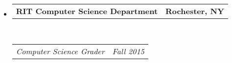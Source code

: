 \documentclass[10pt, letterpaper]{article}
\makeatletter
\newcommand{\headerrow}[2]
{\begin{tabular*}{\linewidth}{l@{\extracolsep{\fill}}r}
	#1 &
	#2 \\
\end{tabular*}}
\makeatother
\begin{document}
\begin{itemize}
	\item
	\headerrow
		{\textbf{RIT Computer Science Department}}
		{\textbf{Rochester, NY}}
	\\
	\headerrow
		{\emph{Computer Science Grader}}
		{\emph{Fall 2015}}

\end{itemize}


\end{document}
